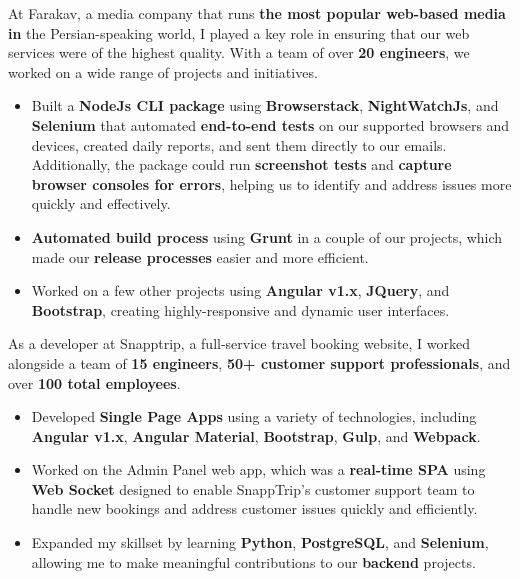\newpage
{}
\bigskip
{}
At Farakav, a media company that runs \textbf{the most popular web-based media in} the Persian-speaking world, I played a key role in ensuring that our web services were of the highest quality. With a team of over \textbf{20 engineers}, we worked on a wide range of projects and initiatives.
\medskip
\begin{itemize}
    \item Built a \textbf{NodeJs CLI package} using \textbf{Browserstack}, \textbf{NightWatchJs}, and \textbf{Selenium} that automated \textbf{end-to-end tests} on our supported browsers and devices, created daily reports, and sent them directly to our emails. Additionally, the package could run \textbf{screenshot tests} and \textbf{capture browser consoles for errors}, helping us to identify and address issues more quickly and effectively.
    \item \textbf{Automated build process} using \textbf{Grunt} in a couple of our projects, which made our \textbf{release processes} easier and more efficient.
    \item Worked on a few other projects using \textbf{Angular v1.x}, \textbf{JQuery}, and \textbf{Bootstrap}, creating highly-responsive and dynamic user interfaces.
\end{itemize}

\bigskip
\divider
\bigskip

As a developer at Snapptrip, a full-service travel booking website, I worked alongside a team of \textbf{15 engineers}, \textbf{50+ customer support professionals}, and over \textbf{100 total employees}.
\medskip
\begin{itemize}
    \item Developed \textbf{Single Page Apps} using a variety of technologies, including \textbf{Angular v1.x}, \textbf{Angular Material}, \textbf{Bootstrap}, \textbf{Gulp}, and \textbf{Webpack}.
    \item Worked on the Admin Panel web app, which was a \textbf{real-time SPA} using \textbf{Web Socket} designed to enable SnappTrip’s customer support team to handle new bookings and address customer issues quickly and efficiently.
    \item Expanded my skillset by learning \textbf{Python}, \textbf{PostgreSQL}, and \textbf{Selenium}, allowing me to make meaningful contributions to our \textbf{backend} projects.
\end{itemize}

